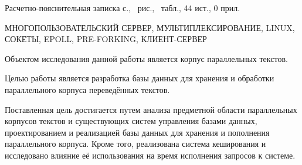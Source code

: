 
Расчетно-пояснительная записка \pageref{LastPage} с., \totalfigures\ рис., \totaltables\ табл., 44 ист., 0 прил.

МНОГОПОЛЬЗОВАТЕЛЬСКИЙ СЕРВЕР,
МУЛЬТИПЛЕКСИРОВАНИЕ,
LINUX,
СОКЕТЫ,
EPOLL,
PRE-FORKING,
КЛИЕНТ-СЕРВЕР

Объектом исследования данной работы является корпус параллельных текстов.

Целью работы является разработка базы данных для хранения и обработки параллельного корпуса переведённых текстов.

Поставленная цель достигается путем анализа предметной области параллельных корпусов текстов и существующих систем управления базами данных, проектированием и реализацией базы данных для хранения и пополнения параллельного корпуса. Кроме того, реализована система кеширования и исследовано влияние её использования на время исполнения запросов к системе.


\pagebreak